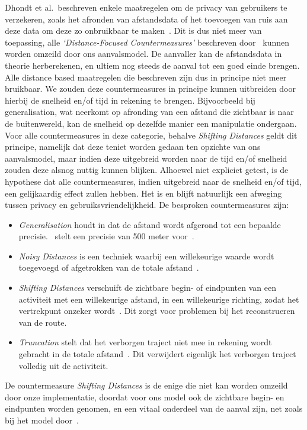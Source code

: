 Dhondt et al.\ beschreven enkele maatregelen om de privacy van gebruikers te
verzekeren, zoals het afronden van afstandsdata of het toevoegen van ruis aan
deze data om deze zo onbruikbaar te maken~\cite{Dhondt}. Dit is dus niet meer
van toepassing, alle \textit{`Distance-Focused Countermeasures'} beschreven
door~\citeauthor{Dhondt} kunnen worden omzeild door ons aanvalsmodel. De
aanvaller kan de afstandsdata in theorie herberekenen, en ultiem nog steeds de
aanval tot een goed einde brengen. Alle distance based maatregelen die
\citeauthor{Dhondt} beschreven zijn dus in principe niet meer bruikbaar. We
zouden deze countermeasures in principe kunnen uitbreiden door hierbij de
snelheid en/of tijd in rekening te brengen. Bijvoorbeeld bij generalisation,
wat neerkomt op afronding van een afstand die zichtbaar is naar de
buitenwereld, kan de snelheid op dezelfde manier een manipulatie ondergaan.
Voor alle countermeasures in deze categorie, behalve \textit{Shifting
      Distances} geldt dit principe, namelijk dat deze teniet worden gedaan ten
opzichte van ons aanvalsmodel, maar indien deze uitgebreid worden naar de tijd
en/of snelheid zouden deze alsnog nuttig kunnen blijken. Alhoewel niet
expliciet getest, is de hypothese dat alle countermeasures, indien uitgebreid
naar de snelheid en/of tijd, een gelijkaardig effect zullen hebben. Het is en
blijft natuurlijk een afweging tussen privacy en gebruiksvriendelijkheid. De
besproken countermeasures zijn:
\begin{itemize}
      \item \textit{Generalisation} houdt in dat de afstand wordt afgerond tot een bepaalde
            precisie.~\citeauthor{Dhondt} stelt een precisie van 500 meter
            voor~\cite{Dhondt}.
      \item \textit{Noisy Distances} is een techniek waarbij een willekeurige waarde wordt
            toegevoegd of afgetrokken van de totale afstand~\cite{Dhondt}.
      \item \textit{Shifting Distances} verschuift de zichtbare begin- of eindpunten van een activiteit met een willekeurige afstand, in een willekeurige richting,
            zodat het vertrekpunt onzeker wordt~\cite{Dhondt}. Dit zorgt voor problemen bij het reconstrueren van de route.
      \item \textit{Truncation} stelt dat het verborgen traject niet mee in rekening wordt gebracht in de
            totale afstand~\cite{Dhondt}. Dit verwijdert eigenlijk het verborgen traject volledig uit de activiteit.
\end{itemize}
De countermeasure \textit{Shifting Distances} is de enige die niet kan worden
omzeild door onze implementatie, doordat voor ons model ook de
zichtbare begin- en eindpunten worden genomen, en een vitaal onderdeel van de
aanval zijn, net zoals bij het model door~\citeauthor{Dhondt}.

